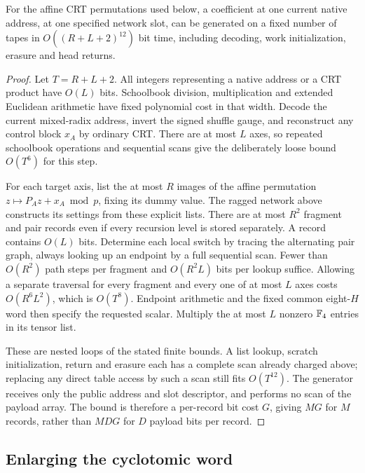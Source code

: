 \begin{lemma}
\label{lem:coefficient-generator}
For the affine CRT permutations used below, a coefficient at one current
native address, at one specified network slot, can be generated on a fixed
number of tapes in $O((R+L+2)^{12})$ bit time, including decoding, work
initialization, erasure and head returns.
\end{lemma}
\begin{proof}
Let $T=R+L+2$. All integers representing a native address or a CRT
product have $O(L)$ bits. Schoolbook division, multiplication and
extended Euclidean arithmetic have fixed polynomial cost in that width.
Decode the current mixed-radix address, invert the signed shuffle gauge,
and reconstruct any control block $x_A$ by ordinary CRT. There are at
most $L$ axes, so repeated schoolbook operations and sequential scans
give the deliberately loose bound $O(T^6)$ for this step.

For each target axis, list the at most $R$ images of the affine
permutation $z\mapsto P_Az+x_A\bmod p$, fixing its dummy value.
The ragged network above constructs its settings from these explicit
lists. There are at most $R^2$ fragment and pair records even if every
recursion level is stored separately. A record contains $O(L)$ bits.
Determine each local switch by tracing the alternating pair graph,
always looking up an endpoint by a full sequential scan. Fewer than
$O(R^2)$ path steps per fragment and $O(R^2L)$ bits per lookup suffice.
Allowing a separate traversal for every fragment and every one of at
most $L$ axes costs $O(R^6L^2)$, which is $O(T^8)$. Endpoint arithmetic
and the fixed common eight-$H$ word then specify the requested scalar.
Multiply the at most $L$ nonzero $\mathbb F_4$ entries in its tensor list.

These are nested loops of the stated finite bounds. A list lookup,
scratch initialization, return and erasure each has a complete scan
already charged above; replacing any direct table access by such a scan
still fits $O(T^{12})$. The generator receives only the public address
and slot descriptor, and performs no scan of the payload array. The
bound is therefore a per-record bit cost $G$, giving $MG$ for $M$
records, rather than $MDG$ for $D$ payload bits per record.
\end{proof}

\subsection{Enlarging the cyclotomic word}

